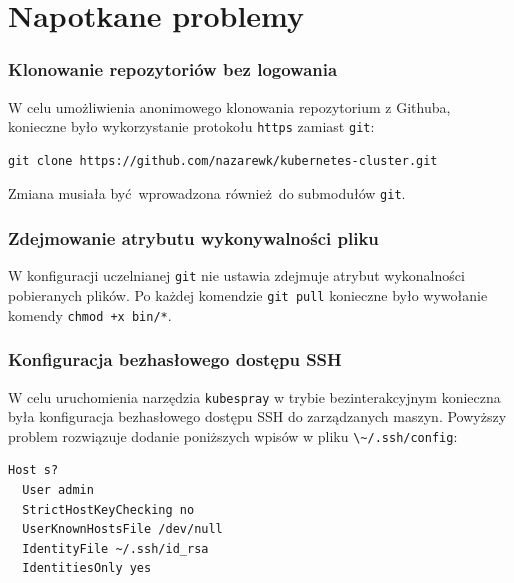 \documentclass[a4paper,12pt,twoside,openany]{report}
\newcommand{\passthrough}[1]{#1}
\begin{document}
\hypertarget{napotkane-problemy}{%
\section{Napotkane problemy}\label{napotkane-problemy}}

\hypertarget{klonowanie-repozytoriuxf3w-bez-logowania}{%
\subsubsection{Klonowanie repozytoriów bez
logowania}\label{klonowanie-repozytoriuxf3w-bez-logowania}}

W celu umożliwienia anonimowego klonowania repozytorium z Githuba,
konieczne było wykorzystanie protokołu \passthrough{\lstinline!https!}
zamiast \passthrough{\lstinline!git!}:

\begin{lstlisting}
git clone https://github.com/nazarewk/kubernetes-cluster.git
\end{lstlisting}

Zmiana musiała być~wprowadzona również~do submodułów
\passthrough{\lstinline!git!}.

\hypertarget{zdejmowanie-atrybutu-wykonywalnoux15bci-pliku}{%
\subsubsection{Zdejmowanie atrybutu wykonywalności
pliku}\label{zdejmowanie-atrybutu-wykonywalnoux15bci-pliku}}

W konfiguracji uczelnianej \passthrough{\lstinline!git!} nie ustawia
zdejmuje atrybut wykonalności pobieranych plików. Po każdej komendzie
\passthrough{\lstinline!git pull!} konieczne było wywołanie komendy
\passthrough{\lstinline!chmod +x bin/*!}.

\hypertarget{konfiguracja-bezhasux142owego-dostux119pu-ssh}{%
\subsubsection{Konfiguracja bezhasłowego dostępu
SSH}\label{konfiguracja-bezhasux142owego-dostux119pu-ssh}}

W celu uruchomienia narzędzia \passthrough{\lstinline!kubespray!} w
trybie bezinterakcyjnym konieczna była konfiguracja bezhasłowego dostępu
SSH do zarządzanych maszyn. Powyższy problem rozwiązuje dodanie
poniższych wpisów w pliku \passthrough{\lstinline!\~/.ssh/config!}:

\begin{lstlisting}
Host s?
  User admin
  StrictHostKeyChecking no
  UserKnownHostsFile /dev/null
  IdentityFile ~/.ssh/id_rsa
  IdentitiesOnly yes
\end{lstlisting}
\end{document}
